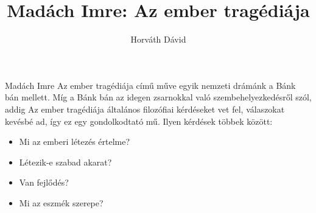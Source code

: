 \documentclass[]{article}
\title{Madách Imre: Az ember tragédiája}
\author{Horváth Dávid}
\begin{document}
	
	\maketitle
	
	Madách Imre Az ember tragédiája című műve egyik nemzeti drámánk a Bánk bán mellett. Míg a Bánk bán az idegen zsarnokkal való szembehelyezkedésről szól, addig Az ember tragédiája általános filozófiai kérdéseket vet fel, válaszokat kevésbé ad, így ez egy gondolkodtató mű. Ilyen kérdések többek között:
	\begin{itemize}
		\item Mi az emberi létezés értelme?
		\item Létezik-e szabad akarat?
		\item Van fejlődés?
		\item Mi az eszmék szerepe?
	\end{itemize}
	
\end{document}
